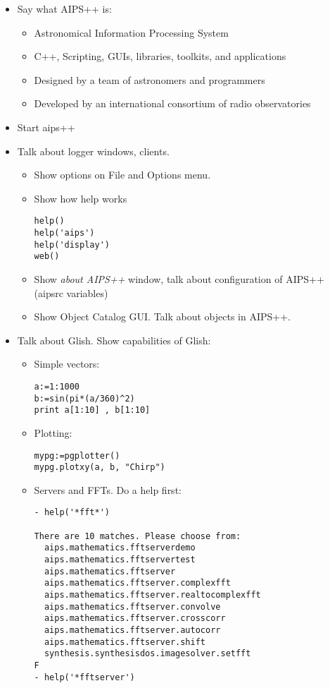 \begin{itemize}
\item Say what AIPS++ is:
\begin{itemize}
\item Astronomical Information Processing System
\item C++, Scripting, GUIs, libraries, toolkits, and applications
\item Designed by a team of astronomers and programmers
\item Developed by an international consortium of radio observatories
\end{itemize}
\item Start aips++
\item Talk about logger windows, clients. 
\begin{itemize}
\item Show options on File and Options menu. 
\item Show how help works
\begin{verbatim}
help()
help('aips')
help('display')
web()
\end{verbatim}
\item Show {\em about AIPS++} window, talk about configuration of
AIPS++ (aipsrc variables)
\item Show Object Catalog GUI. Talk about objects in AIPS++.
\end{itemize}
\item Talk about Glish. Show capabilities of Glish:
\begin{itemize}
\item Simple vectors: 
\begin{verbatim}
a:=1:1000
b:=sin(pi*(a/360)^2)
print a[1:10] , b[1:10]
\end{verbatim}
\item Plotting: 
\begin{verbatim}
mypg:=pgplotter()
mypg.plotxy(a, b, "Chirp")
\end{verbatim}
\item Servers and FFTs. Do a help first:
\begin{verbatim}
- help('*fft*')      

There are 10 matches. Please choose from:
  aips.mathematics.fftserverdemo
  aips.mathematics.fftservertest
  aips.mathematics.fftserver
  aips.mathematics.fftserver.complexfft
  aips.mathematics.fftserver.realtocomplexfft
  aips.mathematics.fftserver.convolve
  aips.mathematics.fftserver.crosscorr
  aips.mathematics.fftserver.autocorr
  aips.mathematics.fftserver.shift
  synthesis.synthesisdos.imagesolver.setfft
F 
- help('*fftserver')


\end{verbatim}
\end{itemize}
\end{itemize}
